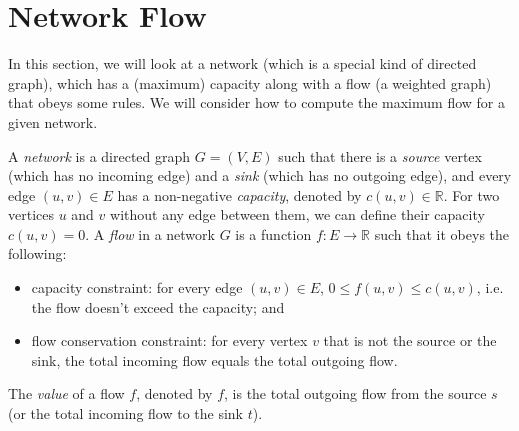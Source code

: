 \documentclass[a4paper, openany]{memoir}
\begin{document}
    \section{Network Flow}
    In this section, we will look at a network (which is a special kind of directed graph), which has a (maximum) capacity along with a flow (a weighted graph) that obeys some rules. We will consider how to compute the maximum flow for a given network.

    A \emph{network} is a directed graph $G = (V, E)$ such that there is a \emph{source} vertex (which has no incoming edge) and a \emph{sink} (which has no outgoing edge), and every edge $(u, v) \in E$ has a non-negative \emph{capacity}, denoted by $c(u, v) \in \mathbb{R}$. For two vertices $u$ and $v$ without any edge between them, we can define their capacity $c(u, v) = 0$. A \emph{flow} in a network $G$ is a function $f \colon E \to \mathbb{R}$ such that it obeys the following:
    \begin{itemize}
        \item capacity constraint: for every edge $(u, v) \in E$, $0 \leq f(u, v) \leq c(u, v)$, i.e. the flow doesn't exceed the capacity; and
        \item flow conservation constraint: for every vertex $v$ that is not the source or the sink, the total incoming flow equals the total outgoing flow.
    \end{itemize}
    The \emph{value} of a flow $f$, denoted by $f$, is the total outgoing flow from the source $s$ (or the total incoming flow to the sink $t$).
\end{document}

